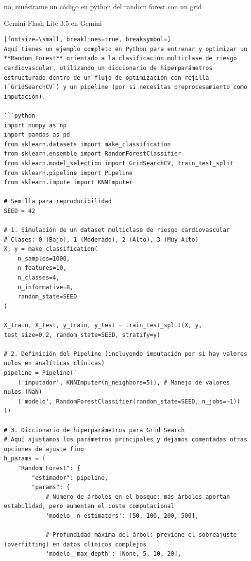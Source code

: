 \documentclass[12pt,a4paper,oneside]{book}
\begin{document}
\begin{iaprompt}
no, muéstrame un código en python del random forest con un grid
\end{iaprompt}
\begin{iaresp}{Gemini Flash Lite 3.5 en Gemini}
\begin{Verbatim}[fontsize=\small, breaklines=true, breaksymbol=]
Aquí tienes un ejemplo completo en Python para entrenar y optimizar un **Random Forest** orientado a la clasificación multiclase de riesgo cardiovascular, utilizando un diccionario de hiperparámetros estructurado dentro de un flujo de optimización con rejilla (`GridSearchCV`) y un pipeline (por si necesitas preprocesamiento como imputación).

```python
import numpy as np
import pandas as pd
from sklearn.datasets import make_classification
from sklearn.ensemble import RandomForestClassifier
from sklearn.model_selection import GridSearchCV, train_test_split
from sklearn.pipeline import Pipeline
from sklearn.impute import KNNImputer

# Semilla para reproducibilidad
SEED = 42

# 1. Simulación de un dataset multiclase de riesgo cardiovascular
# Clases: 0 (Bajo), 1 (Moderado), 2 (Alto), 3 (Muy Alto)
X, y = make_classification(
    n_samples=1000, 
    n_features=10, 
    n_classes=4, 
    n_informative=8, 
    random_state=SEED
)

X_train, X_test, y_train, y_test = train_test_split(X, y, test_size=0.2, random_state=SEED, stratify=y)

# 2. Definición del Pipeline (incluyendo imputación por si hay valores nulos en analíticas clínicas)
pipeline = Pipeline([
    ('imputador', KNNImputer(n_neighbors=5)), # Manejo de valores nulos (NaN)
    ('modelo', RandomForestClassifier(random_state=SEED, n_jobs=-1))
])

# 3. Diccionario de hiperparámetros para Grid Search
# Aquí ajustamos los parámetros principales y dejamos comentadas otras opciones de ajuste fino
h_params = {
    "Random Forest": {
        "estimador": pipeline,
        "params": {
            # Número de árboles en el bosque: más árboles aportan estabilidad, pero aumentan el coste computacional
            'modelo__n_estimators': [50, 100, 200, 500],
            
            # Profundidad máxima del árbol: previene el sobreajuste (overfitting) en datos clínicos complejos
            'modelo__max_depth': [None, 5, 10, 20],
            

\end{Verbatim}
\end{iaresp}
\end{document}
